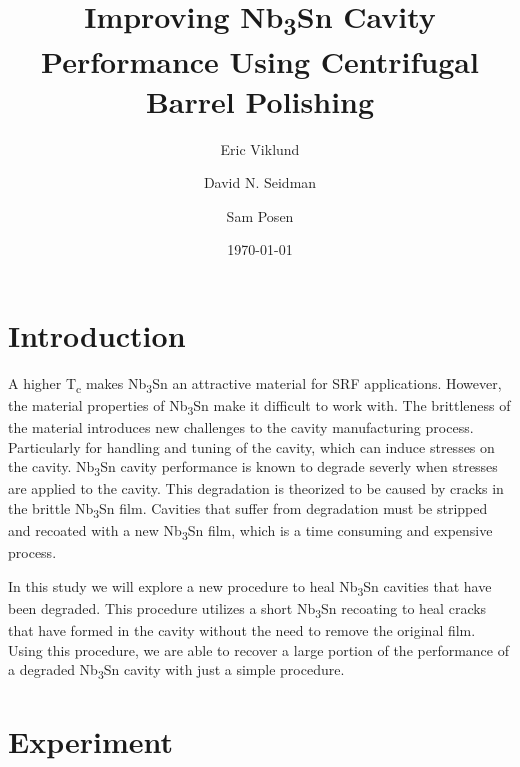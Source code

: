 \documentclass[]{revtex4-2}
\begin{document}
\title{Improving Nb\textsubscript{3}Sn Cavity Performance Using Centrifugal Barrel Polishing}
\author{Eric Viklund}
\author{David N. Seidman}
\author{Sam Posen}


\date{\today}

\begin{abstract}

\end{abstract}

\maketitle

\section{Introduction}
\label{sec:Introduction}

A higher T\textsubscript{c} makes Nb\textsubscript{3}Sn an attractive material for SRF applications. However, the material properties of Nb\textsubscript{3}Sn make it difficult to work with. The brittleness of the material introduces new challenges to the cavity manufacturing process. Particularly for handling and tuning of the cavity, which can induce stresses on the cavity. Nb\textsubscript{3}Sn cavity performance is known to degrade severly when stresses are applied to the cavity. This degradation is theorized to be caused by cracks in the brittle Nb\textsubscript{3}Sn film. Cavities that suffer from degradation must be stripped and recoated with a new Nb\textsubscript{3}Sn film, which is a time consuming and expensive process.

In this study we will explore a new procedure to heal Nb\textsubscript{3}Sn cavities that have been degraded. This procedure utilizes a short Nb\textsubscript{3}Sn recoating to heal cracks that have formed in the cavity without the need to remove the original film. Using this procedure, we are able to recover a large portion of the performance of a degraded Nb\textsubscript{3}Sn cavity with just a simple procedure.

\section{Experiment}
\label{sec:Experiment}
\end{document}
